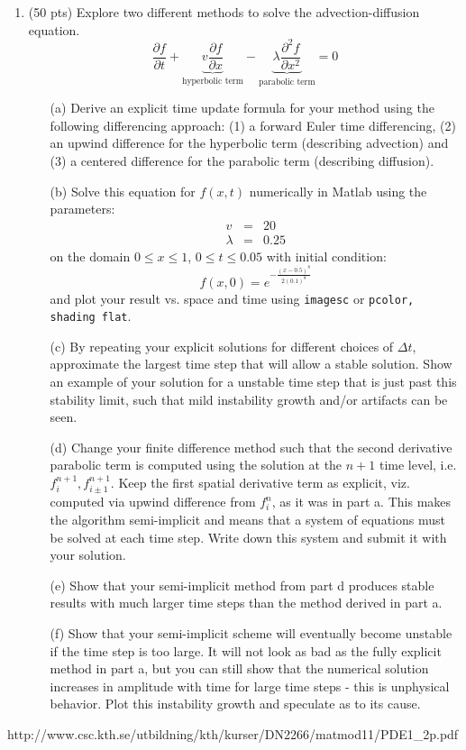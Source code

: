 \documentclass{article}
\begin{document}
\begin{enumerate}
    \item (50 pts) Explore two different methods to solve the advection-diffusion equation.
    \begin{equation}
      \frac{\partial f}{\partial t} + \underbrace{v \frac{\partial f}{\partial x}}_{\text{hyperbolic term}} - \underbrace{\lambda \frac{\partial^2 f}{\partial x^2}}_{\text{parabolic term}}=0
    \end{equation} 
    \begin{enumerate}
      \item[(a)]  Derive an explicit time update formula for your method using the following differencing approach:  (1) a forward Euler time differencing, (2) an upwind difference for the hyperbolic term (describing advection) and (3) a centered difference for the parabolic term (describing diffusion). 
      \item[(b)]  Solve this equation for $f(x,t)$ numerically in Matlab using the parameters:
      \begin{eqnarray}
        v &=& 20 \\
        \lambda &=& 0.25
      \end{eqnarray}
      on the domain $0 \le x \le 1$, $0 \le t \le 0.05$ with initial condition:
      \begin{equation}
        f(x,0)=e^{-\frac{(x-0.5)^8}{2(0.1)^8}}
      \end{equation}
      and plot your result vs. space and time using \texttt{imagesc} or \texttt{pcolor, shading flat}.  
      \item[(c)]  By repeating your explicit solutions for different choices of $\Delta t$, approximate the largest time step that will allow a stable solution.  Show an example of your solution for a unstable time step that is just past this stability limit, such that mild instability growth and/or artifacts can be seen.  
      \item[(d)]  Change your finite difference method such that the second derivative parabolic term is computed using the solution at the $n+1$ time level, i.e. $f_{i}^{n+1},f_{i\pm1}^{n+1}$.  Keep the first spatial derivative term as explicit, viz. computed via upwind difference from $f_i^n$, as it was in part a.  This makes the algorithm semi-implicit and means that a system of equations must be solved at each time step.  Write down this system and submit it with your solution.  
      \item[(e)]  Show that your semi-implicit method from part d produces stable results with much larger time steps than the method derived in part a.    
      \item[(f)]  Show that your semi-implicit scheme will eventually become unstable if the time step is too large.  It will not look as bad as the fully explicit method in part a, but you can still show that the numerical solution increases in amplitude with time for large time steps - this is unphysical behavior.  Plot this instability growth and speculate as to its cause.  
    \end{enumerate}
    
\end{enumerate}

http://www.csc.kth.se/utbildning/kth/kurser/DN2266/matmod11/PDE1_2p.pdf
\end{document}
